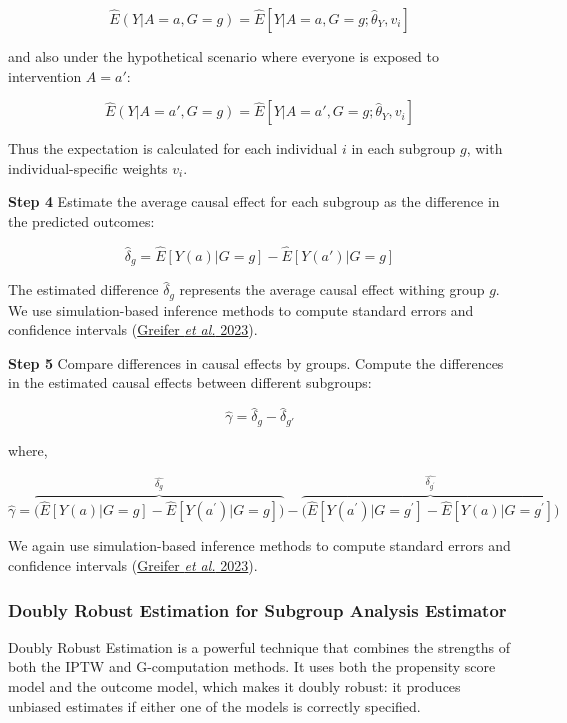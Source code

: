 \documentclass[
  singlecolumn]{article}
\begin{document}
\[\hat{E}(Y|A=a, G=g)  = \hat{E}[Y|A=a,G=g; \hat{\theta}_Y,  v_i]\]

and also under the hypothetical scenario where everyone is exposed to
intervention \(A=a'\):

\[\hat{E}(Y|A=a', G=g)  = \hat{E}[Y|A=a',G=g; \hat{\theta}_Y,  v_i]\]

Thus the expectation is calculated for each individual \(i\) in each
subgroup \(g\), with individual-specific weights \(v_i\).

\textbf{Step 4} Estimate the average causal effect for each subgroup as
the difference in the predicted outcomes:

\[\hat{\delta}_g = \hat{E}[Y(a)|G=g] - \hat{E}[Y(a')|G=g]\]

The estimated difference \(\hat{\delta}_g\) represents the average
causal effect withing group \(g\). We use simulation-based inference
methods to compute standard errors and confidence intervals
(\protect\hyperlink{ref-greifer2023}{Greifer \emph{et al.} 2023}).

\textbf{Step 5} Compare differences in causal effects by groups. Compute
the differences in the estimated causal effects between different
subgroups:

\[\hat{\gamma} = \hat{\delta}_g - \hat{\delta}_{g'}\]

where,

\[\hat{\gamma} = \overbrace{\big( \hat{E}[Y(a)|G=g] - \hat{E}[Y(a^{\prime})|G=g] \big)}^{\hat{\delta_g}} - \overbrace{\big(\hat{E}[Y(a^{\prime})|G=g^{\prime}]- \hat{E}[Y(a)|G=g^{\prime}]\big)}^{\hat{\delta_{g^{\prime}}}}\]

We again use simulation-based inference methods to compute standard
errors and confidence intervals
(\protect\hyperlink{ref-greifer2023}{Greifer \emph{et al.} 2023}).

\hypertarget{doubly-robust-estimation-for-subgroup-analysis-estimator}{%
\subsubsection{Doubly Robust Estimation for Subgroup Analysis
Estimator}\label{doubly-robust-estimation-for-subgroup-analysis-estimator}}

Doubly Robust Estimation is a powerful technique that combines the
strengths of both the IPTW and G-computation methods. It uses both the
propensity score model and the outcome model, which makes it doubly
robust: it produces unbiased estimates if either one of the models is
correctly specified.
\end{document}
